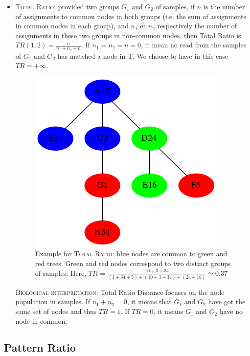 \documentclass{report}
\begin{document}
\begin{itemize}
\item \textsc{Total Ratio:} provided two groups $G_{1}$ and $G_{2}$ of samples, if $n$ is the number of assignments to common nodes in both groups (i.e. the sum of assignments in common nodes in each group), and $n_{1}$ et $n_{2}$ respectively the number of assignments in these two groups in non-common nodes, then Total Ratio is $TR(1,2) = \frac{n}{n_{1} + n_{2} + n}$. If $n_{1} = n_{2} = n = 0$, it mean no read from the samples of $G_{1}$ and $G_{2}$ has matched a node in \textsc{T}. We choose to have in this case $TR = +\infty$.

\begin{figure}[H]
\centering
\includegraphics[scale=0.5]{illustrations/totalratio.png}
\caption{Example for \textsc{Total Ratio}: blue nodes are common to green and red trees. Green and red nodes correspond to two distinct groups of samples. Here, $TR$ = $\frac{10 + 3 + 34}{(1 + 34 + 5) + (10 + 3 + 34) + (24 + 16)} \simeq 0.37$}
\end{figure}

\bigskip

  \textsc{Biological interpretation:} Total Ratio Distance focuses on the node population in samples. If $n_{1} + n_{2} = 0$, it means that $G_{1}$ and $G_{2}$ have got the same set of nodes and thus $TR = 1$. If $TR = 0$, it means $G_{1}$ and $G_{2}$ have no node in common.
\end{itemize}

\subsection{Pattern Ratio}
\end{document}
